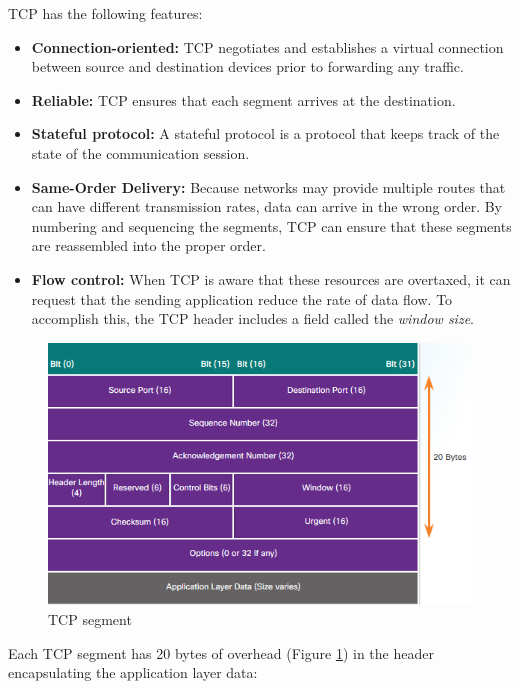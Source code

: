 {TCP has the following features:

\begin{itemize}
\item  \textbf{Connection-oriented:} TCP negotiates and establishes a virtual connection between source and destination devices prior to forwarding any traffic.

\item \textbf{Reliable:} TCP ensures that each segment arrives at the destination. 

\item \textbf{Stateful protocol:} A stateful protocol is a protocol that keeps track of the state of the communication session. 

\item \textbf{Same-Order Delivery:} Because networks may provide multiple routes that can have different transmission rates, data can arrive in the wrong order. By numbering and sequencing the segments, TCP can ensure that these segments are reassembled into the proper order.

\item \textbf{Flow control:} When TCP is aware that these resources are overtaxed, it can request that the sending application reduce the rate of data flow. To accomplish this, the TCP header includes a field called the \emph{window size}.
\end{itemize}

\begin{figure}[hbtp]
\caption{TCP segment}\label{TCPheader}
\centering
\includegraphics[scale=0.5]{pictures/TCPheader.PNG}
\end{figure}


Each TCP segment has 20 bytes of overhead (Figure \ref{TCPheader}) in the header encapsulating the application layer data:

}
